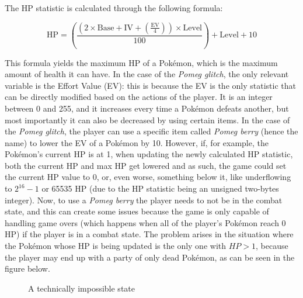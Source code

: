 \documentclass[a4paper]{usiinfbachelorproject}
\begin{document}
The HP statistic is calculated through the following formula:

\begin{equation*}
	\text{HP} = \left( \frac{(2 \times \text{Base} + \text{IV} + \left( \frac{\text{EV}}{4} \right)) \times \text{Level}}{100} \right) + \text{Level} + 10
	\label{eq:pokemon_hp_formula}
\end{equation*}

This formula yields the maximum HP of a Pokémon, which is the maximum amount of health it can have. In the case of the \textit{Pomeg glitch}, the only relevant variable is the Effort Value (EV): this is because the EV is the only statistic that can be directly modified based on the actions of the player. It is an integer between 0 and 255, and it increases every time a Pokémon defeats another, but most importantly it can also be decreased by using certain items. In the case of the \textit{Pomeg glitch}, the player can use a specific item called \textit{Pomeg berry} (hence the name) to lower the EV of a Pokémon by 10. However, if, for example, the Pokémon's current HP is at 1, when updating the newly calculated HP statistic, both the current HP and max HP get lowered and as such, the game could set the current HP value to 0, or, even worse, something below it, like underflowing to $ 2^{16}-1$ or 65535 HP (due to the HP statistic being an unsigned two-bytes integer). Now, to use a \textit{Pomeg berry} the player needs to not be in the combat state, and this can create some issues because the game is only capable of handling game overs (which happens when all of the player's Pokémon reach 0 HP) if the player is in a combat state. The problem arises in the situation where the Pokémon whose HP is being updated is the only one with $HP > 1$, because the player may end up with a party of only dead Pokémon, as can be seen in the figure below.

\begin{figure}[h!]
	\caption{A technically impossible state}\label{fig:dead_team}
\end{figure}
\end{document}

